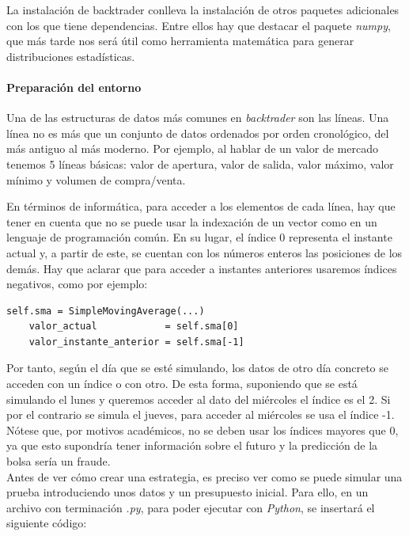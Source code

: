 		La instalaci\'on de backtrader conlleva la instalaci\'on de otros paquetes adicionales con los que tiene dependencias. Entre ellos hay que destacar el paquete \textit{numpy}, que m\'as tarde nos ser\'a \'util como herramienta matem\'atica para generar distribuciones estad\'isticas.
		
		
		\paragraph{Preparaci\'on del entorno}
		
		Una de las estructuras de datos m\'as comunes en \textit{backtrader} son las l\'ineas. Una l\'inea no es m\'as que un conjunto de datos ordenados por orden cronol\'ogico, del m\'as antiguo al m\'as moderno. Por ejemplo, al hablar de un valor de mercado tenemos 5 l\'ineas b\'asicas: valor de apertura, valor de salida, valor m\'aximo, valor m\'inimo y volumen de compra/venta. 
		
		En t\'erminos de inform\'atica, para acceder a los elementos de cada l\'inea, hay que tener en cuenta que no se puede usar la indexaci\'on de un vector como en un lenguaje de programaci\'on com\'un. En su lugar, el \'indice 0 representa el instante actual y, a partir de este, se cuentan con los n\'umeros enteros las posiciones de los dem\'as. Hay que aclarar que para acceder a instantes anteriores usaremos \'indices negativos, como por ejemplo:
		
		\begin{lstlisting}[basicstyle=\tiny]
	self.sma = SimpleMovingAverage(...)
	valor_actual            = self.sma[0]
	valor_instante_anterior = self.sma[-1]
		\end{lstlisting}
		
		\vspace{0.8cm}
		
		Por tanto, seg\'un el d\'ia que se est\'e simulando, los datos de otro d\'ia concreto se acceden con un \'indice o con otro. De esta forma, suponiendo que se est\'a simulando el lunes y queremos acceder al dato del mi\'ercoles el \'indice es el 2. Si por el contrario se simula el jueves, para acceder al mi\'ercoles se usa el \'indice -1. N\'otese que, por motivos acad\'emicos, no se deben usar los \'indices mayores que 0, ya que esto supondr\'ia tener informaci\'on sobre el futuro y la predicci\'on de la bolsa ser\'ia un fraude.\\
		
		Antes de ver c\'omo crear una estrategia, es preciso ver como se puede simular una prueba introduciendo unos datos y un presupuesto inicial. Para ello, en un archivo con terminaci\'on \textit{.py}, para poder ejecutar con \textit{Python}, se insertar\'a el siguiente c\'odigo:
		
